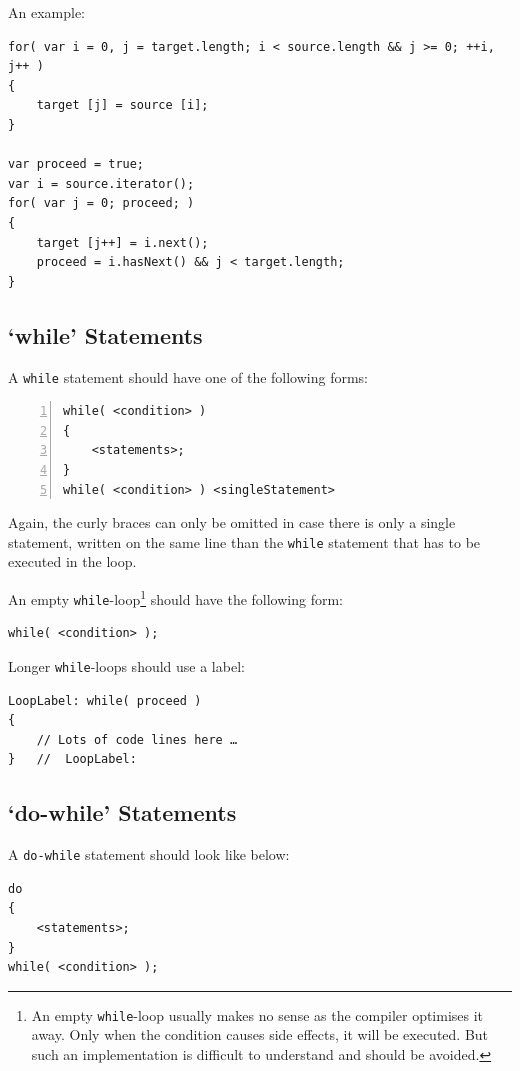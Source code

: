 \documentclass[11pt,a4paper, titlepage, parskip=half, headsepline, footsepline, cleardoublepage=current, headheight=1cm]{scrbook}
\begin{document}
An example:
\begin{lstlisting}
for( var i = 0, j = target.length; i < source.length && j >= 0; ++i, j++ )
{
    target [j] = source [i];
}

var proceed = true;
var i = source.iterator();
for( var j = 0; proceed; )
{
    target [j++] = i.next();
    proceed = i.hasNext() && j < target.length;
}
\end{lstlisting}


\subsection{‘while’ Statements}\label{sec:WhileStatements}
A \lstinline|while| statement should have one of the following forms:
\begin{lstlisting}[numbers=left]
while( <condition> )
{
    <statements>;
}
while( <condition> ) <singleStatement>
\end{lstlisting}

Again, the curly braces can only be omitted in case there is only a single statement, written on the same line than the \lstinline|while| statement that has to be executed in the loop.

An empty \lstinline|while|-loop\footnote{An empty \lstinline|while|-loop usually makes no sense as the compiler optimises it away. Only when the condition causes side effects, it will be executed. But such an implementation is difficult to understand and should be avoided.} should have the following form: 
\begin{lstlisting}
while( <condition> );
\end{lstlisting}

Longer \lstinline|while|-loops should use a label:
\begin{lstlisting}
LoopLabel: while( proceed )
{
    // Lots of code lines here …
}   //  LoopLabel:
\end{lstlisting}


\subsection{‘do-while’ Statements}
A \lstinline|do-while| statement should look like below:
\begin{lstlisting}
do
{
    <statements>;
}
while( <condition> );
\end{lstlisting}
\end{document}
